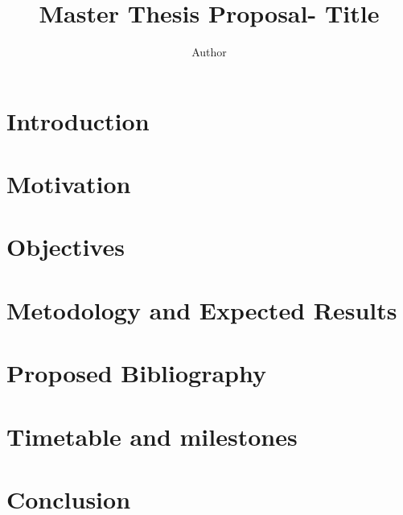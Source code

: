 \documentclass{article}
\begin{document}
\title{Master Thesis Proposal- Title}
\author{Author}

\maketitle
\tableofcontents

\section{Introduction}

\section{Motivation}

\section{Objectives}
\section{Metodology and Expected Results}
\section{Proposed Bibliography}

\section{Timetable and milestones}

\section{Conclusion}
\end{document}
